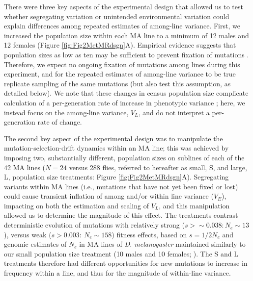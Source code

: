 There were three key aspects of the experimental design that allowed us to test whether segregating variation or unintended environmental variation could explain differences among repeated estimates of among-line variance. First, we increased the population size within each MA line to a minimum of 12 males and 12 females (Figure \ref{fig:Fig2MetMRdsgn}A). Empirical evidence suggests that population sizes as low as ten may be sufficient to prevent fixation of mutations \cite{Este04,Katj15,Luij18}. Therefore, we expect no ongoing fixation of mutations among lines during this experiment, and for the repeated estimates of among-line variance to be true replicate sampling of the same mutations (but also test this assumption, as detailed below). We note that these changes in census population size complicate calculation of a per-generation rate of increase in phenotypic variance \citep{Lync86, Lync98c12}; here, we instead focus on the among-line variance, $V_L$, and do not interpret a per-generation rate of change. \par

The second key aspect of the experimental design was to manipulate the mutation-selection-drift dynamics within an MA line; this was achieved by imposing two, substantially different, population sizes on sublines of each of the 42 MA lines ($N = 24$ versus 288 flies, referred to hereafter as small, S, and large, L, population size treatments: Figure \ref{fig:Fig2MetMRdsgn}A). Segregating variants within MA lines (i.e., mutations that have not yet been fixed or lost) could cause transient inflation of among and/or within line variance ($V_E$), impacting on both the estimation and scaling of $V_L$, and this manipulation allowed us to determine the magnitude of this effect. The treatments contrast deterministic evolution of mutations with relatively strong ($s > \sim0.038{: } N_e \sim 13$), versus weak ($s > 0.003{: }~N_e \sim 158$) fitness effects, based on $s = 1/2N_e$ \citep{Wrig31,Kimu83} and genomic estimates of $N_e$ in MA lines of \textit{D. melanogaster} maintained similarly to our small population size treatment (10 males and 10 females; \citealp{Huan16}). The S and L treatments therefore had different opportunities for new mutations to increase in frequency within a line, and thus for the magnitude of within-line variance.\par

